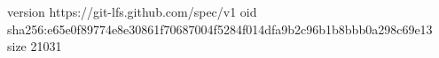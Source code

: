 version https://git-lfs.github.com/spec/v1
oid sha256:e65e0f89774e8e30861f70687004f5284f014dfa9b2c96b1b8bbb0a298c69e13
size 21031
